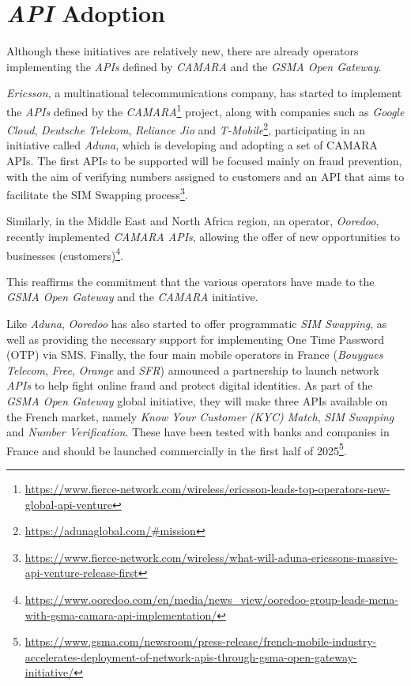 \section{\emph{API} Adoption} Although these initiatives are
relatively new, there are already operators implementing the
\emph{APIs} defined by \emph{CAMARA} and the \emph{GSMA Open
Gateway}.

\emph{Ericsson}, a multinational telecommunications company, has
started to implement the \emph{APIs} defined by the \emph{CAMARA}\footnote{\url{https://www.fierce-network.com/wireless/ericsson-leads-top-operators-new-global-api-venture}} project, along with companies such as \emph{Google Cloud},
\emph{Deutsche Telekom}, \emph{Reliance Jio} and
\emph{T-Mobile}\footnote{\url{https://adunaglobal.com/\#mission}},
participating in an initiative called \emph{Aduna}, which is
developing and adopting a set of CAMARA APIs. The first APIs to
be supported will be focused mainly on fraud prevention, with the
aim of verifying numbers assigned to customers and an API that
aims to facilitate the SIM Swapping
process\footnote{\url{https://www.fierce-network.com/wireless/what-will-aduna-ericssons-massive-api-venture-release-first}}.

Similarly, in the Middle East and North Africa region, an
operator, \emph{Ooredoo}, recently implemented \emph{CAMARA
APIs}, allowing the offer of new opportunities to businesses
(customers)\footnote{\url{https://www.ooredoo.com/en/media/news_view/ooredoo-group-leads-mena-with-gsma-camara-api-implementation/}}.

This reaffirms the commitment that the various operators have
made to the \emph{GSMA Open Gateway} and the \emph{CAMARA}
initiative.

Like \emph{Aduna}, \emph{Ooredoo} has also started to offer
programmatic \emph{SIM Swapping}, as well as providing the
necessary support for implementing One Time Password (OTP) via
SMS. Finally, the four main mobile operators in France
(\emph{Bouygues Telecom}, \emph{Free}, \emph{Orange} and
\emph{SFR}) announced a partnership to launch network \emph{APIs}
to help fight online fraud and protect digital identities. As
part of the \emph{GSMA Open Gateway} global initiative, they will
make three APIs available on the French market, namely \emph{Know
Your Customer (KYC) Match}, \emph{SIM Swapping} and \emph{Number
Verification}. These have been tested with banks and companies in
France and should be launched commercially in the first half of
2025\footnote{\url{https://www.gsma.com/newsroom/press-release/french-mobile-industry-accelerates-deployment-of-network-apis-through-gsma-open-gateway-initiative/}}.

